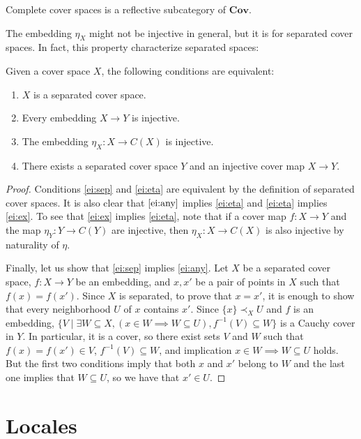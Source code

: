 \documentclass[reqno]{amsart}
\theoremstyle{definition}
\theoremstyle{remark}
\numberwithin{figure}{section}
\newcommand{\rb}{\prec}
\newcommand{\cat}[1]{\mathbf{#1}}
\begin{document}
\begin{cor}
Complete cover spaces is a reflective subcategory of $\cat{Cov}$.
\end{cor}

The embedding $\eta_X$ might not be injective in general, but it is for separated cover spaces.
In fact, this property characterize separated spaces:

\begin{prop}
Given a cover space $X$, the following conditions are equivalent:
\begin{enumerate}
\item \label{ei:sep} $X$ is a separated cover space.
\item \label{ei:any} Every embedding $X \to Y$ is injective.
\item \label{ei:eta} The embedding $\eta_X : X \to C(X)$ is injective.
\item \label{ei:ex} There exists a separated cover space $Y$ and an injective cover map $X \to Y$.
\end{enumerate}
\end{prop}
\begin{proof}
Conditions \eqref{ei:sep} and \eqref{ei:eta} are equivalent by the definition of separated cover spaces.
It is also clear that $\eqref{ei:any}$ implies \eqref{ei:eta} and \eqref{ei:eta} implies \eqref{ei:ex}.
To see that \eqref{ei:ex} implies \eqref{ei:eta}, note that if a cover map $f : X \to Y$ and the map $\eta_Y : Y \to C(Y)$ are injective,
then $\eta_X : X \to C(X)$ is also injective by naturality of $\eta$.

Finally, let us show that \eqref{ei:sep} implies \eqref{ei:any}.
Let $X$ be a separated cover space, $f : X \to Y$ be an embedding, and $x,x'$ be a pair of points in $X$ such that $f(x) = f(x')$.
Since $X$ is separated, to prove that $x = x'$, it is enough to show that every neighborhood $U$ of $x$ contains $x'$.
Since $\{ x \} \rb_X U$ and $f$ is an embedding, $\{ V \mid \exists W \subseteq X, (x \in W \implies W \subseteq U), f^{-1}(V) \subseteq W \}$ is a Cauchy cover in $Y$.
In particular, it is a cover, so there exist sets $V$ and $W$ such that $f(x) = f(x') \in V$, $f^{-1}(V) \subseteq W$, and implication $x \in W \implies W \subseteq U$ holds.
But the first two conditions imply that both $x$ and $x'$ belong to $W$ and the last one implies that $W \subseteq U$, so we have that $x' \in U$.
\end{proof}

\section{Locales}
\label{sec:locales}
\end{document}
